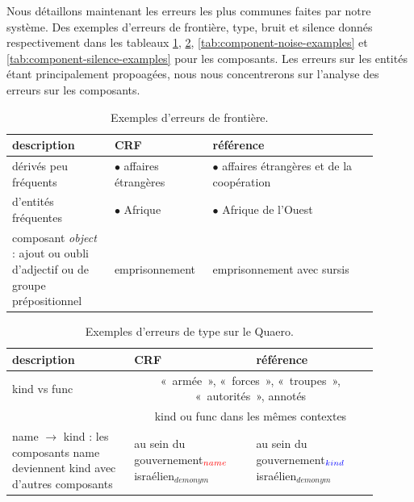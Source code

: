 \documentclass[PhD-Yoann-Dupont.tex]{subfiles}
\begin{document}
Nous détaillons maintenant les erreurs les plus communes faites par notre système. Des exemples d'erreurs de frontière, type, bruit et silence donnés respectivement dans les tableaux \ref{tab:component-boundary-examples}, \ref{tab:component-type-examples}, \ref{tab:component-noise-examples} et  \ref{tab:component-silence-examples} pour les composants. Les erreurs sur les entités étant principalement propoagées, nous nous concentrerons sur l'analyse des erreurs sur les composants.

\begin{table}[ht!]
\centering
\small
\begin{tabular}{|p{0.26\linewidth}|p{0.22\linewidth}|p{0.42\linewidth}|}
\hline
description                                                 & CRF & référence \\
\hline
dérivés peu fréquents & $\bullet$ affaires étrangères & $\bullet$ affaires étrangères et de la coopération \\
d'entités fréquentes  & $\bullet$ Afrique             & $\bullet$ Afrique de l'Ouest \\
\hline
composant \textit{object} : ajout ou oubli d'adjectif ou de groupe prépositionnel & emprisonnement & emprisonnement avec sursis \\
\hline
\end{tabular}
\caption{Exemples d'erreurs de frontière.}
\label{tab:component-boundary-examples}
\end{table}

\begin{table}[ht!]
\centering
\begin{tabular}{|p{0.3\linewidth}|p{0.3\linewidth}|p{0.3\linewidth}|}
\hline
description                                                 & CRF & référence \\
\hline
kind vs func                                                                             & \multicolumn{2}{c|}{«~armée~», «~forces~», «~troupes~», «~autorités~», annotés} \\
                                                                                         & \multicolumn{2}{c|}{kind ou func dans les mêmes contextes} \\
\hline
name $\rightarrow$ kind : les composants name deviennent kind avec d'autres composants   & au sein du gouvernement$_{\textcolor{red}{name}}$ israélien$_{demonym}$ & au sein du gouvernement$_{\textcolor{blue}{kind}}$ israélien$_{demonym}$ \\
\hline
\end{tabular}
\caption{Exemples d'erreurs de type sur le Quaero.}
\label{tab:component-type-examples}
\end{table}
\end{document}
